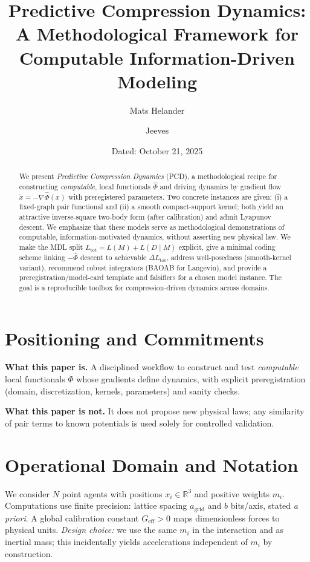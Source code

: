 \documentclass[11pt,a4paper]{article}
\title{\bf Predictive Compression Dynamics:\\
A Methodological Framework for Computable Information-Driven Modeling}
\author[1]{Mats Helander}
\author[1]{Jeeves}
\affil[1]{Independent Research}
\date{Dated: October 21, 2025}
\numberwithin{equation}{section}
\newcommand{\R}{\mathbb{R}}
\begin{document}
\maketitle

\begin{abstract}
\noindent
We present \emph{Predictive Compression Dynamics} (PCD), a methodological recipe for constructing \emph{computable}, local functionals $\widehat{\Phi}$ and driving dynamics by gradient flow $\dot x=-\nabla\widehat{\Phi}(x)$ with preregistered parameters. Two concrete instances are given: (i) a fixed-graph pair functional and (ii) a smooth compact-support kernel; both yield an attractive inverse-square two-body form (after calibration) and admit Lyapunov descent. We emphasize that these models serve as methodological demonstrations of computable, information-motivated dynamics, without asserting new physical law. We make the MDL split $L_{\text{tot}}=L(M)+L(D\mid M)$ explicit, give a minimal coding scheme linking $-\widehat{\Phi}$ descent to achievable $\Delta L_{\text{tot}}$, address well-posedness (smooth-kernel variant), recommend robust integrators (BAOAB for Langevin), and provide a preregistration/model-card template and falsifiers for a chosen model instance. The goal is a reproducible toolbox for compression-driven dynamics across domains.
\end{abstract}

\section{Positioning and Commitments}
\textbf{What this paper is.}  
A disciplined workflow to construct and test \emph{computable} local functionals $\widehat{\Phi}$ whose gradients define dynamics, with explicit preregistration (domain, discretization, kernels, parameters) and sanity checks.

\medskip
\noindent\textbf{What this paper is not.}  
It does not propose new physical laws; any similarity of pair terms to known potentials is used solely for controlled validation.

\section{Operational Domain and Notation}
We consider $N$ point agents with positions $x_i\in\R^3$ and positive weights $m_i$. Computations use finite precision: lattice spacing $a_{\text{grid}}$ and $b$ bits/axis, stated \emph{a priori}. A global calibration constant $G_{\text{eff}}>0$ maps dimensionless forces to physical units. \emph{Design choice:} we use the same $m_i$ in the interaction and as inertial mass; this incidentally yields accelerations independent of $m_i$ by construction.
\end{document}
